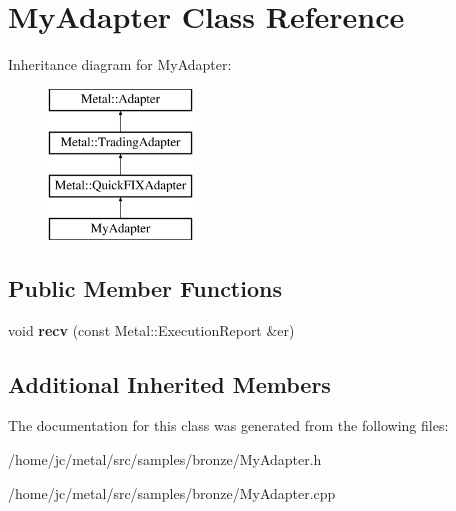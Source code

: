 \hypertarget{classMyAdapter}{}\section{My\+Adapter Class Reference}
\label{classMyAdapter}
Inheritance diagram for My\+Adapter\+:\begin{figure}[H]
\begin{center}
\leavevmode
\includegraphics[height=4.000000cm]{classMyAdapter}
\end{center}
\end{figure}
\subsection*{Public Member Functions}
\begin{DoxyCompactItemize}
\item 
\hypertarget{classMyAdapter_ab9501e0d8759c7c9312b8315de499e30}{}void {\bfseries recv} (const Metal\+::\+Execution\+Report \&er)\label{classMyAdapter_ab9501e0d8759c7c9312b8315de499e30}

\end{DoxyCompactItemize}
\subsection*{Additional Inherited Members}


The documentation for this class was generated from the following files\+:\begin{DoxyCompactItemize}
\item 
/home/jc/metal/src/samples/bronze/My\+Adapter.\+h\item 
/home/jc/metal/src/samples/bronze/My\+Adapter.\+cpp\end{DoxyCompactItemize}
